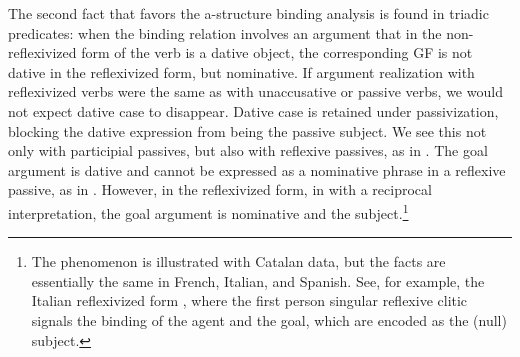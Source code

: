 \documentclass[output=paper,hidelinks]{langscibook}
\begin{document}
The second fact that favors the a-structure binding analysis is found in triadic predicates: when the binding relation involves an argument that in the non-reflexivized form of the verb is a dative object, the corresponding GF is not dative in the reflexivized form, but nominative. If argument realization with reflexivized verbs were the same as with unaccusative or passive verbs, we would not expect dative case to disappear. Dative case is retained under passivization, blocking the dative expression from being the passive subject. We see this not only with participial passives, but also with reflexive passives, as in . The goal argument is dative and cannot be expressed as a nominative phrase in a reflexive passive, as in . However, in the reflexivized form, in  with a reciprocal interpretation, the goal argument is nominative and the subject.\footnote{The phenomenon is illustrated with Catalan data, but the facts are essentially the same in French, Italian, and Spanish. See, for example, the Italian reflexivized form , where the first person singular reflexive clitic signals the binding of the agent and the goal, which are encoded as the (null) subject.}
\end{document}
